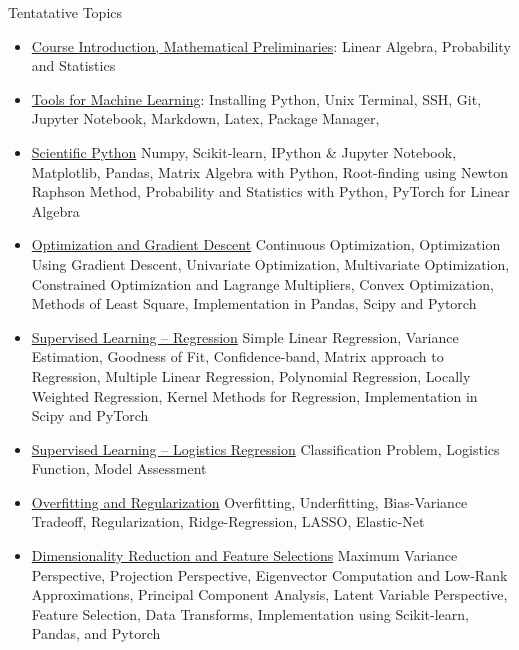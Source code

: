 \documentclass[aspectratio=169,xcolor=dvipsnames,svgnames,x11names,fleqn]{beamer}
\begin{document}
\begin{frame}{Tentatative Topics}
\tiny
\begin{itemize}
	\item \color{DarkRed} \underline{Course Introduction, Mathematical Preliminaries}: Linear Algebra, Probability and Statistics
	

		\item \color{DarkRed} \underline{Tools for Machine Learning}: Installing Python, Unix Terminal, SSH, Git, Jupyter Notebook, Markdown, Latex, Package Manager, 
	
	
 
    \item \color{DarkRed} \underline{Scientific Python} Numpy, Scikit-learn, IPython \& Jupyter Notebook, Matplotlib, Pandas, Matrix Algebra with Python,  Root-finding using Newton Raphson Method, Probability and Statistics with Python, PyTorch for Linear Algebra

    \item  \color{DarkRed} \underline{Optimization and Gradient Descent} Continuous Optimization, Optimization Using Gradient Descent,  Univariate Optimization, Multivariate Optimization, Constrained Optimization and Lagrange Multipliers, Convex Optimization, Methods of Least Square, Implementation in Pandas, Scipy and Pytorch
    
    \item   \color{DarkRed} \underline{Supervised Learning -- Regression}  Simple Linear Regression, Variance Estimation, Goodness of Fit, Confidence-band, Matrix approach to Regression, Multiple Linear Regression, Polynomial Regression, Locally Weighted Regression, Kernel Methods for Regression, Implementation in Scipy and PyTorch
    
    \item  \color{DarkRed} \underline{Supervised Learning -- Logistics Regression} Classification Problem, Logistics Function, Model Assessment

    \item  \color{DarkRed} \underline{Overfitting and Regularization} Overfitting, Underfitting, Bias-Variance Tradeoff, Regularization, Ridge-Regression, LASSO, Elastic-Net
    
    \item \color{DarkRed} \underline{Dimensionality Reduction and Feature Selections}  Maximum Variance Perspective, Projection Perspective, Eigenvector Computation and Low-Rank Approximations, Principal Component Analysis, Latent Variable Perspective,  Feature Selection, Data Transforms, Implementation using Scikit-learn, Pandas, and Pytorch
    

\end{itemize}
\end{frame}
\end{document}
